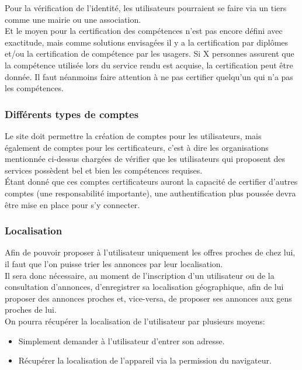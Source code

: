 \documentclass[a4paper,11pt]{article}
\begin{document}
Pour la vérification de l'identité, les utilisateurs pourraient se faire via un tiers comme une mairie ou une association.\\

Et le moyen pour la certification des compétences n'est pas encore défini avec exactitude, mais comme solutions envisagées il y a la certification par diplômes et/ou la certification de compétence par les usagers.
Si X personnes assurent que la compétence utilisée lors du service rendu est acquise, la certification peut être donnée.
Il faut néanmoins faire attention à ne pas certifier quelqu'un qui n'a pas les compétences.\\

\subsubsection{Différents types de comptes}

Le site doit permettre la création de comptes pour les utilisateurs, mais également de comptes
pour les certificateurs, c'est à dire les organisations mentionnée ci-dessus chargées de vérifier que les utilisateurs
qui proposent des services possèdent bel et bien les compétences requises.\\

Étant donné que ces comptes certificateurs auront la capacité de certifier d'autres comptes (une responsabilité importante), une authentification plus poussée devra être mise en place pour s'y connecter.\\

\subsubsection{Localisation}

Afin de pouvoir proposer à l'utilisateur uniquement les offres proches de chez lui, il faut que l'on
puisse trier les annonces par leur localisation.\\

Il sera donc nécessaire, au moment de l'inscription d'un utilisateur ou de la consultation d'annonces, d'enregistrer sa localisation
géographique, afin de lui proposer des annonces proches et, vice-versa, de proposer ses annonces aux gens proches de lui.\\

On pourra récupérer la localisation de l'utilisateur par plusieurs moyens:\\
\begin{itemize}
  \item Simplement demander à l'utilisateur d'entrer son adresse.
  \item Récupérer la localisation de l'appareil via la permission du navigateur.
\end{itemize}
\end{document}
